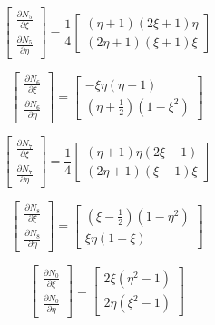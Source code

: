 \documentclass[a4paper, 12pt]{article}
\begin{document}
\begin{enumerate}
\begin{enumerate}
			\[
				\begin{bmatrix}
				\frac{\partial N_5}{\partial \xi} \\ 
				\frac{\partial N_5}{\partial \eta}
				\end{bmatrix}
				=
				\frac{1}{4}
				\begin{bmatrix}
				(\eta + 1)(2\xi + 1)\eta \\ 
				(2\eta + 1)(\xi + 1)\xi
				\end{bmatrix}
			\]

			\[
				\begin{bmatrix}
				\frac{\partial N_6}{\partial \xi} \\ 
				\frac{\partial N_6}{\partial \eta}
				\end{bmatrix}
				=
				\begin{bmatrix}
				-\xi \eta (\eta + 1) \\ 
				\left(\eta + \frac{1}{2}\right)(1 - \xi^2)
				\end{bmatrix}
			\]

			\[
				\begin{bmatrix}
				\frac{\partial N_7}{\partial \xi} \\ 
				\frac{\partial N_7}{\partial \eta}
				\end{bmatrix}
				=
				\frac{1}{4}
				\begin{bmatrix}
				(\eta + 1)\eta(2\xi - 1) \\ 
				(2\eta + 1)(\xi - 1)\xi
				\end{bmatrix}
			\]

			\[
				\begin{bmatrix}
				\frac{\partial N_8}{\partial \xi} \\ 
				\frac{\partial N_8}{\partial \eta}
				\end{bmatrix}
				=
				\begin{bmatrix}
				\left(\xi - \frac{1}{2}\right)(1 - \eta^2) \\ 
				\xi \eta (1 - \xi)
				\end{bmatrix}
			\]

			\[
				\begin{bmatrix}
				\frac{\partial N_0}{\partial \xi} \\ 
				\frac{\partial N_0}{\partial \eta}
				\end{bmatrix}
				=
				\begin{bmatrix}
				2\xi (\eta^2 - 1) \\ 
				2 \eta (\xi^2 - 1)
				\end{bmatrix}
			\]


\end{enumerate}
\end{enumerate}
\end{document}
